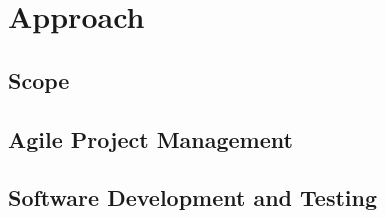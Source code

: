 \chapter{Approach}

\section{Scope}
\section{Agile Project Management}
\section{Software Development and Testing}